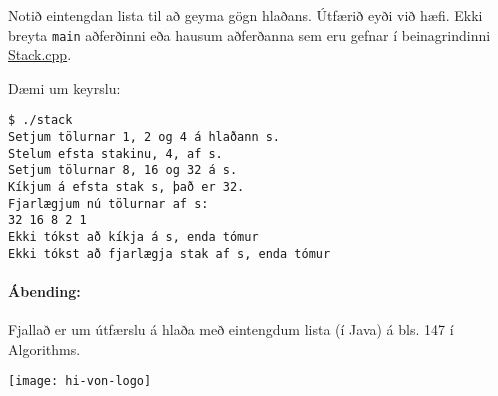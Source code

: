 \documentclass{article}
\begin{document}
Notið eintengdan lista til að geyma gögn hlaðans. Útfærið eyði við hæfi. Ekki breyta \texttt{main} aðferðinni eða hausum aðferðanna sem eru gefnar í beinagrindinni \href{https://raw.githubusercontent.com/Ernir/kennsluefni/master/T2/Code/w5/Stack.cpp}{Stack.cpp}.

Dæmi um keyrslu:

\begin{verbatim}
$ ./stack
Setjum tölurnar 1, 2 og 4 á hlaðann s.
Stelum efsta stakinu, 4, af s.
Setjum tölurnar 8, 16 og 32 á s.
Kíkjum á efsta stak s, það er 32.
Fjarlægjum nú tölurnar af s:
32 16 8 2 1
Ekki tókst að kíkja á s, enda tómur
Ekki tókst að fjarlægja stak af s, enda tómur
\end{verbatim}

\paragraph{Ábending:} Fjallað er um útfærslu á hlaða með eintengdum lista (í Java) á bls. 147 í Algorithms.

\vfill
\texttt{[image: hi-von-logo]}
\end{document}
